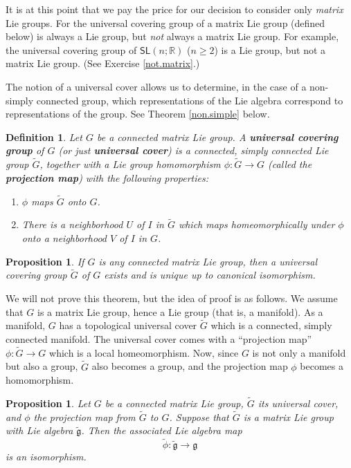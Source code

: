 \documentclass{amsbook}
\let \frak = \mathfrak
\theoremstyle{plain}
\newtheorem{definition}[theorem]{Definition}
\newtheorem{proposition}[theorem]{Proposition}
\numberwithin{equation}{chapter}
\numberwithin{theorem}{chapter}
\begin{document}
It is at this point that we pay the price for our decision to consider only
\textit{matrix} Lie groups. For the universal covering group of a matrix Lie
group (defined below) is always a Lie group, but \textit{not} always a matrix
Lie group. For example, the universal covering group of $\mathsf{SL}\left(
n;\mathbb{R}\right)  $ ($n\ge2$) is a Lie group, but not a matrix Lie group.
(See Exercise \ref{not.matrix}.)

The notion of a universal cover allows us to determine, in the case of a
non-simply connected group, which representations of the Lie algebra
correspond to representations of the group. See Theorem \ref{non.simple} below.

\begin{definition}
Let $G$ be a connected matrix Lie group. A \textbf{universal covering group}
of $G$ (or just \textbf{universal cover}) is a connected, simply connected Lie
group $\widetilde{G}$, together with a Lie group homomorphism $\phi
:\widetilde{G}\rightarrow G$ (called the \textbf{projection map}) with the
following properties:

\begin{enumerate}
\item $\phi$ maps $\widetilde{G}$ onto $G$.

\item  There is a neighborhood $U$ of $I$ in $\widetilde{G}$ which maps
homeomorphically under $\phi$ onto a neighborhood $V$ of $I$ in $G$.
\end{enumerate}
\end{definition}

\begin{proposition}
If $G$ is any connected matrix Lie group, then a universal covering group
$\widetilde{G}$ of $G$ exists and is unique up to canonical isomorphism.
\end{proposition}

We will not prove this theorem, but the idea of proof is as follows. We assume
that $G$ is a matrix Lie group, hence a Lie group (that is, a manifold). As a
manifold, $G$ has a topological universal cover $\widetilde{G}$ which is a
connected, simply connected manifold. The universal cover comes with a
``projection map'' $\phi:\widetilde{G}\rightarrow G$ which is a local
homeomorphism. Now, since $G$ is not only a manifold but also a group,
$\widetilde{G}$ also becomes a group, and the projection map $\phi$ becomes a homomorphism.

\begin{proposition}
\label{cover.iso}Let $G$ be a connected matrix Lie group, $\widetilde{G}$ its
universal cover, and $\phi$ the projection map from $\widetilde{G}$ to $G$.
Suppose that $\widetilde{G}$ is a matrix Lie group with Lie algebra
$\widetilde{\frak{g}}$. Then the associated Lie algebra map
\[
\widetilde{\phi}:\widetilde{\frak{g}}\rightarrow\frak{g}%
\]
is an isomorphism.
\end{proposition}
\end{document}
